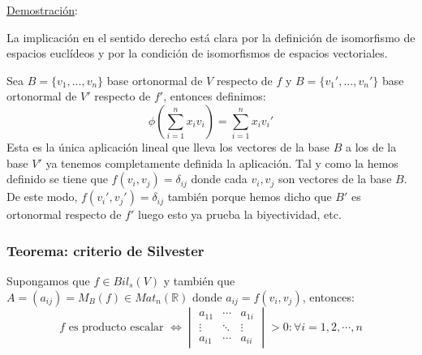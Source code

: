 \documentclass[10pt,a4paper,openright]{book}
\begin{document}
\underline{Demostración}:

La implicación en el sentido derecho está clara por la definición de isomorfismo de espacios euclídeos y por la condición de isomorfismos de espacios vectoriales.

Sea $B=\{v_1, ... , v_n\}$ base ortonormal de $V$ respecto de $f$ y $B=\{v_1', ..., v_n'\}$ base ortonormal de $V'$ respecto de $f'$, entonces definimos:
$$\phi\left(\sum_{i=1}^{n}x_iv_i\right)=\sum_{i=1}^{n}x_iv_i'$$
Esta es la única aplicación lineal que lleva los vectores de la base $B$ a los de la base $V'$ ya tenemos completamente definida la aplicación. Tal y como la hemos definido se tiene que $f(v_i,v_j) = \delta_{ij}$ donde cada $v_i, v_j$ son vectores de la base $B$. De este modo, $f(v_i',v_j') = \delta_{ij}$ también porque hemos dicho que $B'$ es ortonormal respecto de $f'$ luego esto ya prueba la biyectividad, etc.

\subsubsection*{Teorema: criterio de Silvester}
Supongamos que $f\in Bil_s(V)$ y también que $A=(a_{ij})=M_B(f)\in Mat_n(\mathbb R)$ donde $a_{ij} = f(v_i,v_j)$, entonces:
$$f\mbox{ es producto escalar }\Leftrightarrow\begin{vmatrix} a_{11} & \cdots & a_{1i} \\ \vdots & \ddots & \vdots \\ a_{i1} & \cdots & a_{ii}\end{vmatrix} > 0 : \forall i =1, 2, \cdots , n$$
\end{document}
